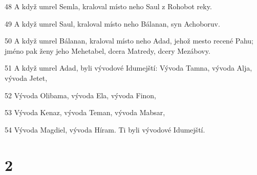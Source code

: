 \par 48 A když umrel Semla, kraloval místo neho Saul z Rohobot reky.
\par 49 A když umrel Saul, kraloval místo neho Bálanan, syn Achoboruv.
\par 50 A když umrel Bálanan, kraloval místo neho Adad, jehož mesto recené Pahu; jméno pak ženy jeho Mehetabel, dcera Matredy, dcery Mezábovy.
\par 51 A když umrel Adad, byli vývodové Idumejští: Vývoda Tamna, vývoda Alja, vývoda Jetet,
\par 52 Vývoda Olibama, vývoda Ela, vývoda Finon,
\par 53 Vývoda Kenaz, vývoda Teman, vývoda Mabsar,
\par 54 Vývoda Magdiel, vývoda Híram. Ti byli vývodové Idumejští.

\chapter{2}

